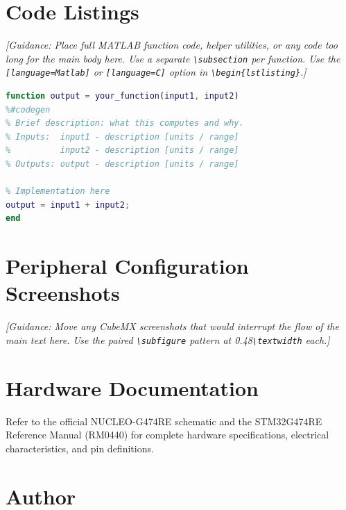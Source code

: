 \section{Code Listings}
\label{app:code}

\textit{[Guidance: Place full MATLAB function code, helper
utilities, or any code too long for the main body here. Use
a separate \texttt{\textbackslash subsection} per function. Use the
\texttt{[language=Matlab]} or \texttt{[language=C]} option in
\texttt{\textbackslash begin\{lstlisting\}}.]}

\begin{lstlisting}[language=Matlab, caption=\texttt{your\_function.m} --- brief one-line description]
function output = your_function(input1, input2)
%#codegen
% Brief description: what this computes and why.
% Inputs:  input1 - description [units / range]
%          input2 - description [units / range]
% Outputs: output - description [units / range]

% Implementation here
output = input1 + input2;
end
\end{lstlisting}

\section{Peripheral Configuration Screenshots}
\label{app:cubemx}

\textit{[Guidance: Move any CubeMX screenshots that would
interrupt the flow of the main text here. Use the paired
\texttt{\textbackslash subfigure} pattern at 0.48\texttt{\textbackslash textwidth} each.]}

\section{Hardware Documentation}

Refer to the official NUCLEO-G474RE schematic and the STM32G474RE Reference
Manual (RM0440) for complete hardware specifications, electrical
characteristics, and pin definitions.

\newpage
\section*{Author}

